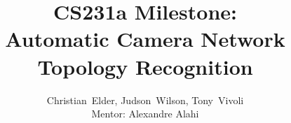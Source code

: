 \documentclass[journal]{IEEEtran}
\begin{document}
%
\title{CS231a Milestone:\\ Automatic Camera Network Topology Recognition}
%
%
%

\author{Christian~Elder,
	     Judson~Wilson,
	     Tony~Vivoli\\
	     Mentor: Alexandre Alahi}

% 


\maketitle

%






%
\IEEEpeerreviewmaketitle
\end{document}

